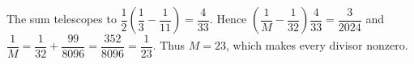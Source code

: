 The sum telescopes to $\dfrac{1}{2}(\dfrac{1}{3}-\dfrac{1}{11})=\dfrac{4}{33}$. Hence $\left(\dfrac{1}{M}-\dfrac{1}{32}\right)\dfrac{4}{33}=\dfrac{3}{2024}$ and $\dfrac{1}{M}=\dfrac{1}{32}+\dfrac{99}{8096}=\dfrac{352}{8096}=\dfrac{1}{23}$. Thus $\boxed{M=23}$, which makes every divisor nonzero.
